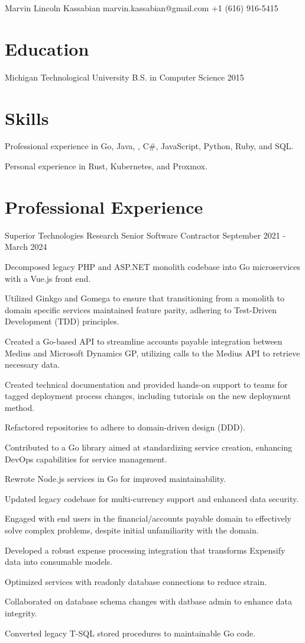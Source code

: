\documentclass{marvinkassabian_resume}
\begin{document}
\resumeheadersimple
{Marvin Lincoln Kassabian}
{marvin.kassabian@gmail.com}
{+1 (616) 916-5415}

\section{Education}
\subsectionlocationdate
{Michigan Technological University}
{B.S. in Computer Science}
{2015}

\section{Skills}
\resumesublistbegin
\item Professional experience in Go, Java, \cpp, C\#, JavaScript, Python, Ruby, and SQL.
\item Personal experience in Rust, Kubernetes, and Proxmox.
\resumesublistend

\section{Professional Experience}

\subsectionpositiondate
{Superior Technologies Research}
{Senior Software Contractor}
{September 2021 - March 2024}
\resumesublistbegin
\item Decomposed legacy PHP and ASP.NET monolith codebase into Go microservices with a Vue.js front end.
\item Utilized Ginkgo and Gomega to ensure that transitioning from a monolith to domain specific services maintained feature parity, adhering to Test-Driven Development (TDD) principles.
\item Created a Go-based API to streamline accounts payable integration between Medius and Microsoft Dynamics GP, utilizing calls to the Medius API to retrieve necessary data.
\item Created technical documentation and provided hands-on support to teams for tagged deployment process changes, including tutorials on the new deployment method.
\item Refactored repositories to adhere to domain-driven design (DDD).
\item Contributed to a Go library aimed at standardizing service creation, enhancing DevOps capabilities for service management.
\item Rewrote Node.js services in Go for improved maintainability.
\item Updated legacy codebase for multi-currency support and enhanced data security.
\item Engaged with end users in the financial/accounts payable domain to effectively solve complex problems, despite initial unfamiliarity with the domain.
\item Developed a robust expense processing integration that transforms Expensify data into consumable models.
\item Optimized services with readonly database connections to reduce strain.
\item Collaborated on database schema changes with datbase admin to enhance data integrity.
\item Converted legacy T-SQL stored procedures to maintainable Go code.
\resumesublistend
\end{document}
